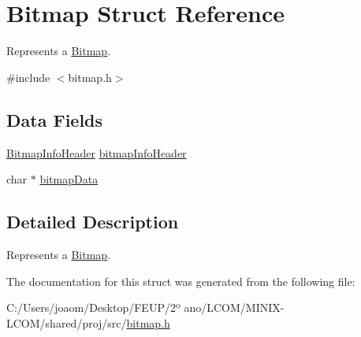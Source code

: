\hypertarget{struct_bitmap}{}\section{Bitmap Struct Reference}
\label{struct_bitmap}


Represents a \mbox{\hyperlink{struct_bitmap}{Bitmap}}.  




{\ttfamily \#include $<$bitmap.\+h$>$}

\subsection*{Data Fields}
\begin{DoxyCompactItemize}
\item 
\mbox{\hyperlink{struct_bitmap_info_header}{Bitmap\+Info\+Header}} \mbox{\hyperlink{group__bitmap_ga7157ca7f3ce4be47481c472fafd89313}{bitmap\+Info\+Header}}
\item 
char $\ast$ \mbox{\hyperlink{group__bitmap_ga212b0ad51a5ac5d020dcf840678ef146}{bitmap\+Data}}
\end{DoxyCompactItemize}


\subsection{Detailed Description}
Represents a \mbox{\hyperlink{struct_bitmap}{Bitmap}}. 

The documentation for this struct was generated from the following file\+:\begin{DoxyCompactItemize}
\item 
C\+:/\+Users/joaom/\+Desktop/\+F\+E\+U\+P/2º ano/\+L\+C\+O\+M/\+M\+I\+N\+I\+X-\/\+L\+C\+O\+M/shared/proj/src/\mbox{\hyperlink{bitmap_8h}{bitmap.\+h}}\end{DoxyCompactItemize}
